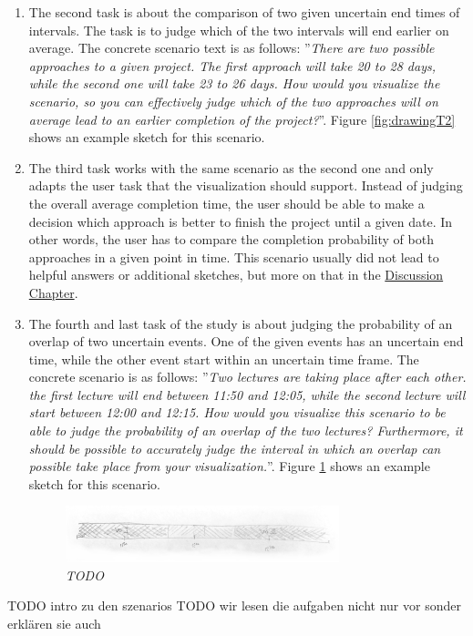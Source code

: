 \begin{enumerate}
	\item The second task is about the comparison of two given uncertain end times of intervals. The task is to judge which of the two intervals will end earlier on average. The concrete scenario text is as follows: ''\textit{There are two possible approaches to a given project. The first approach will take 20 to 28 days, while the second one will take 23 to 26 days. How would you visualize the scenario, so you can effectively judge which of the two approaches will on average lead to an earlier completion of the project?}''. Figure \ref{fig:drawingT2} shows an example sketch for this scenario.
	
	\item The third task works with the same scenario as the second one and only adapts the user task that the visualization should support. Instead of judging the overall average completion time, the user should be able to make a decision which approach is better to finish the project until a given date. In other words, the user has to compare the completion probability of both approaches in a given point in time. This scenario usually did not lead to helpful answers or additional sketches, but more on that in the \hyperref[ch:discussion]{Discussion Chapter}.
	
	\item The fourth and last task of the study is about judging the probability of an overlap of two uncertain events. One of the given events has an uncertain end time, while the other event start within an uncertain time frame. The concrete scenario is as follows: ''\textit{Two lectures are taking place after each other. the first lecture will end between 11:50 and 12:05, while the second lecture will start between 12:00 and 12:15. How would you visualize this scenario to be able to judge the probability of an overlap of the two lectures? Furthermore, it should be possible to accurately judge the interval in which an overlap can possible take place from your visualization.}''. Figure \ref{fig:drawingT4} shows an example sketch for this scenario.
	
	\begin{figure}[H]
		\centering
		\includegraphics[width=0.75\textwidth]{figures/drawingT4.png}
		\caption{\textit{TODO}}
		\label{fig:drawingT4}
	\end{figure}
\end{enumerate} 

TODO intro zu den szenarios
TODO wir lesen die aufgaben nicht nur vor sonder erklären sie auch